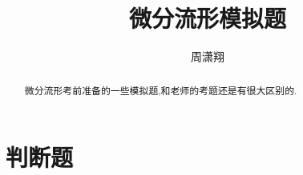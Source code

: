 \documentclass{ctexart}
\numberwithin{equation}{section}
\theoremstyle{plain}
\theoremstyle{plain}
\numberwithin{equation}{section}
\theoremstyle{remark}
\begin{document}
\date{}

\title
{微分流形模拟题}


\author{周潇翔}
\maketitle




\begin{abstract}
微分流形考前准备的一些模拟题,和老师的考题还是有很大区别的.
\end{abstract}






\section{判断题}
\end{document}
